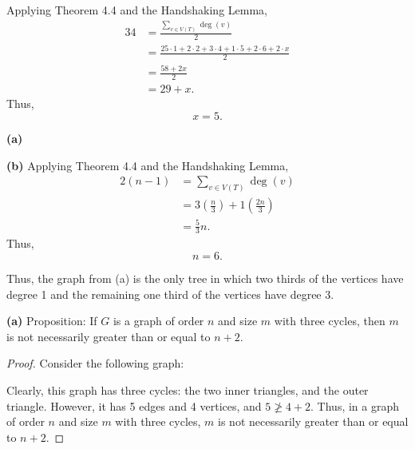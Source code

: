 \documentclass[12pt]{article}
\begin{document}
\newpage{}
Applying Theorem 4.4 and the Handshaking Lemma,
\begin{align*}
    34 &= \frac{\sum\limits_{v \in V(T)} \deg(v)}2 \\
       &= \frac{25 \cdot 1 + 2 \cdot 2 + 3 \cdot 4 + 1 \cdot 5 + 2 \cdot 6 + 2 \cdot x}2 \\
       &= \frac{58+2x}2 \\
       &= 29 + x.
\end{align*}
Thus, $$x = 5.$$

\newpage{}

{\bf (a)}
\begin{center}
\end{center}

{\bf (b)}
Applying Theorem 4.4 and the Handshaking Lemma,
\begin{align*}
    2(n-1) &= \sum_{v \in V(T)} \deg(v) \\
           &= 3\left(\frac n3\right) + 1\left(\frac{2n}3\right) \\
           &= \frac53n.
\end{align*}
Thus, $$n=6.$$

Thus, the graph from (a) is the only tree in which two thirds of the vertices have degree 1 and the remaining one third of the vertices have degree 3.

\newpage{}

{\bf (a)} Proposition: If $G$ is a graph of order $n$ and size $m$ with three cycles, then $m$ is not necessarily greater than or equal to $n+2$.
\begin{proof}
    Consider the following graph:
    \begin{center}
    \end{center}
    Clearly, this graph has three cycles: the two inner triangles, and the outer triangle.
    However, it has 5 edges and 4 vertices, and $5 \not \geq 4+2$.
    Thus, in a graph of order $n$ and size $m$ with three cycles, $m$ is not necessarily greater than or equal to $n+2$.
\end{proof}
\end{document}
